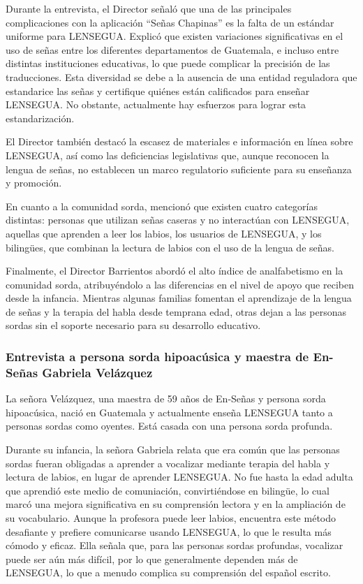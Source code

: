 Durante la entrevista, el Director señaló que una de las principales complicaciones con la aplicación ``Señas Chapinas'' es la falta de un estándar uniforme para LENSEGUA. Explicó que existen variaciones significativas en el uso de señas entre los diferentes departamentos de Guatemala, e incluso entre distintas instituciones educativas, lo que puede complicar la precisión de las traducciones. Esta diversidad se debe a la ausencia de una entidad reguladora que estandarice las señas y certifique quiénes están calificados para enseñar LENSEGUA. No obstante, actualmente hay esfuerzos para lograr esta estandarización.

El Director también destacó la escasez de materiales e información en línea sobre LENSEGUA, así como las deficiencias legislativas que, aunque reconocen la lengua de señas, no establecen un marco regulatorio suficiente para su enseñanza y promoción.

En cuanto a la comunidad sorda, mencionó que existen cuatro categorías distintas: personas que utilizan señas caseras y no interactúan con LENSEGUA, aquellas que aprenden a leer los labios, los usuarios de LENSEGUA, y los bilingües, que combinan la lectura de labios con el uso de la lengua de señas.

Finalmente, el Director Barrientos abordó el alto índice de analfabetismo en la comunidad sorda, atribuyéndolo a las diferencias en el nivel de apoyo que reciben desde la infancia. Mientras algunas familias fomentan el aprendizaje de la lengua de señas y la terapia del habla desde temprana edad, otras dejan a las personas sordas sin el soporte necesario para su desarrollo educativo.

\subsubsection{Entrevista a persona sorda hipoacúsica y maestra de En-Señas Gabriela Velázquez}
La señora Velázquez, una maestra de 59 años de En-Señas y persona sorda hipoacúsica, nació en Guatemala y actualmente enseña LENSEGUA tanto a personas sordas como oyentes. Está casada con una persona sorda profunda. 

Durante su infancia, la señora Gabriela relata que era común que las personas sordas fueran obligadas a aprender a vocalizar mediante terapia del habla y lectura de labios, en lugar de aprender LENSEGUA. No fue hasta la edad adulta que aprendió este medio de comuniación, convirtiéndose en bilingüe, lo cual marcó una mejora significativa en su comprensión lectora y en la ampliación de su vocabulario. Aunque la profesora puede leer labios, encuentra este método desafiante y prefiere comunicarse usando LENSEGUA, lo que le resulta más cómodo y eficaz. Ella señala que, para las personas sordas profundas, vocalizar puede ser aún más difícil, por lo que generalmente dependen más de LENSEGUA, lo que a menudo complica su comprensión del español escrito.

